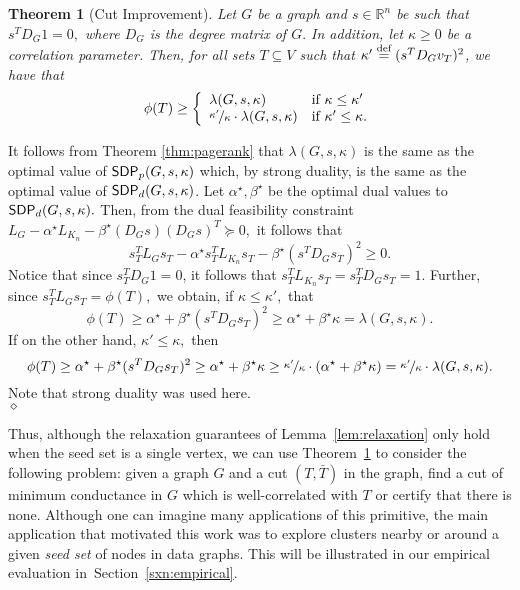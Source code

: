 \documentclass[11pt]{article}
\newtheorem{theorem}{Theorem}
\newenvironment{proof}{\noindent {\em Proof:}}{\\\hspace*{\fill}\mbox{$\diamond$}}
\newcommand{\nfrac}{\nicefrac}
\newcommand{\sdp}{{\sf SDP}}
\newcommand{\defeq}{\stackrel{\textup{def}}{=}}
\begin{document}
\begin{theorem}[Cut Improvement]
\label{thm:improve}
Let $G$ be a  graph and $s \in \mathbb{R}^{n}$ be such that
$s^{T}D_{G} 1=0,$ where $D_{G}$ is the degree matrix of $G.$
In addition, let $\kappa \geq 0$ be a correlation parameter.
Then, for all sets $T \subseteq V$ such that
$\kappa' \defeq  (s^{T}D_{G}v_{T})^{2}$, we have that
\[
\phi(T) \geq \left\{ \begin{array}{ll}
                       \lambda(G,s,\kappa)
                       & \mbox{if $\kappa \leq \kappa'$} \\
                       \nfrac{\kappa'}{\kappa} \cdot \lambda(G,s,\kappa)
                       & \mbox{if $\kappa' \leq \kappa$.}
                    \end{array}
            \right.
\]
\end{theorem}
\begin{proof}
It follows from Theorem \ref{thm:pagerank} that $\lambda(G,s,\kappa)$ is the 
same as the optimal value of $\sdp_{p}(G,s,\kappa)$ which, by strong 
duality, is the same as the optimal value of $\sdp_{d}(G,s,\kappa)$. 
Let $\alpha^{\star},\beta^{\star}$ be the optimal dual values to 
$\sdp_{d}(G, s,\kappa).$ 
Then, from the dual feasibility constraint 
$ L_{G}- \alpha^\star  L_{K_{n}}  - \beta^\star ( D_G {s})( D_G {s})^T \succeq 0 ,$
it follows that 
$$ s_{T}^{T}L_{G}s_{T} - \alpha^{\star}s_{T}^{T}L_{K_{n}}s_{T}-\beta^{\star} (s^T D_G s_{T})^{2} \geq 0.$$
Notice that since $ s_{T}^T D_G 1 =0$, it follows that 
$ s_{T}^{T}L_{K_{n}}s_{T}=s_{T}^{T}D_Gs_{T}=1$.
Further, since $s_{T}^{T}L_{G}s_{T}=\phi(T),$ we obtain, if $\kappa \leq \kappa',$ that  
$$
\phi(T) \geq \alpha^{\star} + \beta^{\star} ( s^T D_G s_{T} )^{2} \geq  \alpha^{\star} + \beta^{\star}\kappa = \lambda (G,s,\kappa).
$$
If on the other hand, $\kappa' \leq \kappa,$ then
$$\phi(T) \geq \alpha^{\star} + \beta^{\star} (s^T D_G s_{T}) ^{2} \geq \alpha^{\star} + \beta^{\star}\kappa \geq   \nfrac{ \kappa'}{\kappa} \cdot (\alpha^{\star} + \beta^{\star}\kappa) =\nfrac{ \kappa'}{\kappa} \cdot  \lambda (G,s,\kappa).
$$
Note that strong duality was used here. 
\end{proof}

\noindent
Thus, although the relaxation guarantees of Lemma~\ref{lem:relaxation} only 
hold when the seed set is a single vertex, we can use 
Theorem~\ref{thm:improve} to consider the following problem: given a graph 
$G$ and a cut $(T,\bar{T})$ in the graph, find a cut of minimum conductance 
in $G$ which is well-correlated with $T$ or certify that there is none. 
Although one can imagine many applications of this primitive, the main 
application that motivated this work was to explore  clusters nearby or 
around a given \emph{seed set} of nodes in data graphs.  
This will be illustrated in our empirical evaluation 
in~Section~\ref{sxn:empirical}. 
\end{document}
